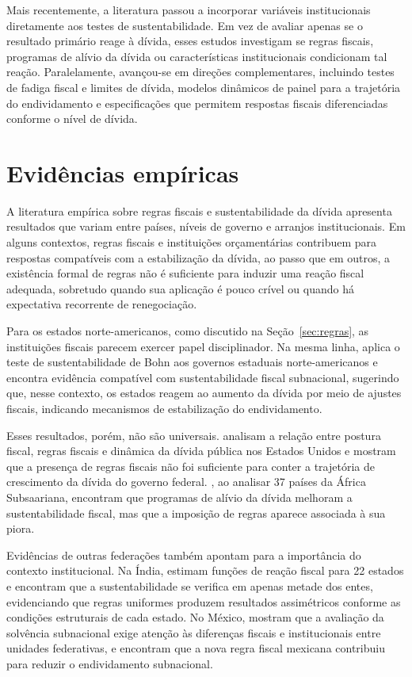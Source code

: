 Mais recentemente, a literatura passou a incorporar variáveis institucionais diretamente aos testes de sustentabilidade. Em vez de avaliar apenas se o resultado primário reage à dívida, esses estudos investigam se regras fiscais, programas de alívio da dívida ou características institucionais condicionam tal reação. Paralelamente, avançou-se em direções complementares, incluindo testes de fadiga fiscal e limites de dívida, modelos dinâmicos de painel para a trajetória do endividamento e especificações que permitem respostas fiscais diferenciadas conforme o nível de dívida. 


\section{Evidências empíricas}

A literatura empírica sobre regras fiscais e sustentabilidade da dívida apresenta resultados que variam entre países, níveis de governo e arranjos institucionais. Em alguns contextos, regras fiscais e instituições orçamentárias contribuem para respostas compatíveis com a estabilização da dívida, ao passo que em outros, a existência formal de regras não é suficiente para induzir uma reação fiscal adequada, sobretudo quando sua aplicação é pouco crível ou quando há expectativa recorrente de renegociação.

Para os estados norte-americanos, como discutido na Seção~\ref{sec:regras}, as instituições fiscais parecem exercer papel disciplinador. Na mesma linha,  aplica o teste de sustentabilidade de Bohn aos governos estaduais norte-americanos e encontra evidência compatível com sustentabilidade fiscal subnacional, sugerindo que, nesse contexto, os estados reagem ao aumento da dívida por meio de ajustes fiscais, indicando mecanismos de estabilização do endividamento.

Esses resultados, porém, não são universais.  analisam a relação entre postura fiscal, regras fiscais e dinâmica da dívida pública nos Estados Unidos e mostram que a presença de regras fiscais não foi suficiente para conter a trajetória de crescimento da dívida do governo federal. , ao analisar 37 países da África Subsaariana, encontram que programas de alívio da dívida melhoram a sustentabilidade fiscal, mas que a imposição de regras aparece associada à sua piora. 

Evidências de outras federações também apontam para a importância do contexto institucional. Na Índia,  estimam funções de reação fiscal para 22 estados e encontram que a sustentabilidade se verifica em apenas metade dos entes, evidenciando que regras uniformes produzem resultados assimétricos conforme as condições estruturais de cada estado. No México,  mostram que a avaliação da solvência subnacional exige atenção às diferenças fiscais e institucionais entre unidades federativas, e  encontram que a nova regra fiscal mexicana contribuiu para reduzir o endividamento subnacional.

